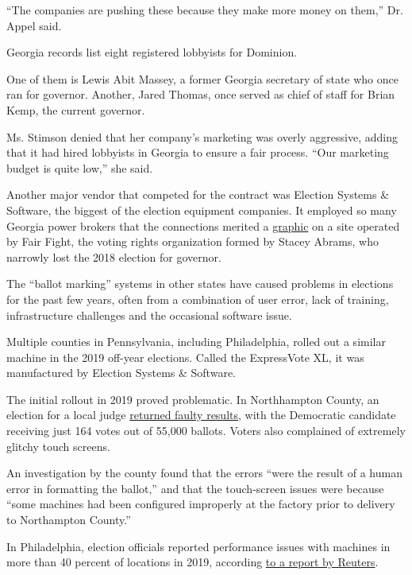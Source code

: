 ``The companies are pushing these because they make more money on
them,'' Dr. Appel said.

Georgia records list eight registered lobbyists for Dominion.

One of them is Lewis Abit Massey, a former Georgia secretary of state
who once ran for governor. Another, Jared Thomas, once served as chief
of staff for Brian Kemp, the current governor.

Ms. Stimson denied that her company's marketing was overly aggressive,
adding that it had hired lobbyists in Georgia to ensure a fair process.
``Our marketing budget is quite low,'' she said.

Another major vendor that competed for the contract was Election Systems
\& Software, the biggest of the election equipment companies. It
employed so many Georgia power brokers that the connections merited a
\href{https://fairfight.com/brian-kemp-web-of-voter-suppression-and-ess-influence/}{graphic}
on a site operated by Fair Fight, the voting rights organization formed
by Stacey Abrams, who narrowly lost the 2018 election for governor.

The ``ballot marking'' systems in other states have caused problems in
elections for the past few years, often from a combination of user
error, lack of training, infrastructure challenges and the occasional
software issue.

Multiple counties in Pennsylvania, including Philadelphia, rolled out a
similar machine in the 2019 off-year elections. Called the ExpressVote
XL, it was manufactured by Election Systems \& Software.

The initial rollout in 2019 proved problematic. In Northhampton County,
an election for a local judge
\href{https://www.nytimes3xbfgragh.onion/2019/11/30/us/politics/pennsylvania-voting-machines.html}{returned
faulty results}, with the Democratic candidate receiving just 164 votes
out of 55,000 ballots. Voters also complained of extremely glitchy touch
screens.

An investigation by the county found that the errors ``were the result
of a human error in formatting the ballot,'' and that the touch-screen
issues were because ``some machines had been configured improperly at
the factory prior to delivery to Northampton County.''

In Philadelphia, election officials reported performance issues with
machines in more than 40 percent of locations in 2019, according
\href{https://in.reuters.com/article/usa-election-pennsylvania-machines/exclusive-philadelphias-new-voting-machines-under-scrutiny-in-tuesdays-elections-idINKBN2382D2}{to
a report by Reuters}.


